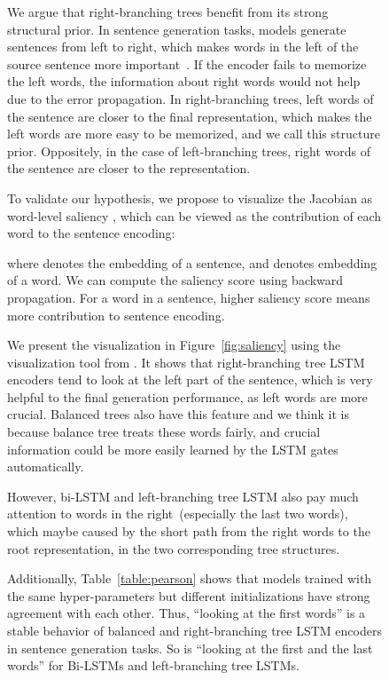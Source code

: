 \documentclass[11pt,a4paper]{article}
\begin{document}
\begin{figure}[t!]
We argue that right-branching trees benefit from its strong structural prior.
In sentence generation tasks, models generate sentences from left to right, which makes words in the left of the source sentence more important~\cite{sutskever2014sequence}.
If the encoder fails to memorize the left words, the information about right words would not help due to the error propagation.
In right-branching trees, left words of the sentence are closer to the final representation, which makes the left words are more easy to  be memorized, and we call this structure prior.
Oppositely, in the case of  left-branching trees, right words of the sentence are closer to the representation.

To validate our hypothesis, we propose to visualize the Jacobian as word-level saliency \cite{shi2018learning}, which can be viewed as the contribution of each word to the sentence encoding: 

where  denotes the embedding of a sentence, and  denotes embedding of a word.
We can compute the saliency score using backward propagation.
For a word in a sentence, higher saliency score means more contribution to  sentence encoding. 

We present the visualization in Figure~\ref{fig:saliency} using the visualization tool from .
It shows that right-branching tree LSTM encoders tend to look at the left part of the sentence, which is very helpful to the final generation performance, as left words are more crucial.
Balanced trees also have this feature and we think it is because balance tree treats these words fairly, and crucial information could be more easily learned by the LSTM gates automatically.

However, bi-LSTM and left-branching tree LSTM also pay much attention to words in the right~(especially the last two words), which maybe caused by the short path from the right words to the root representation, in the two corresponding tree structures. 

Additionally, Table~\ref{table:pearson} shows that models trained with the same hyper-parameters but different initializations have strong agreement with each other. 
Thus, ``looking at the first words'' is a stable behavior of balanced and right-branching tree LSTM encoders in sentence generation tasks. So is ``looking at the first and the last words'' for Bi-LSTMs and left-branching tree LSTMs.



\end{figure}
\end{document}
